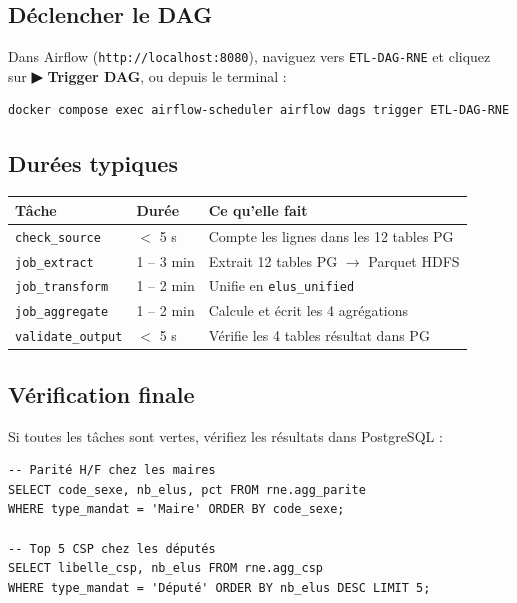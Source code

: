 \documentclass[11pt,a4paper]{article}
\begin{document}
\subsection*{Déclencher le DAG}

Dans Airflow (\texttt{http://localhost:8080}), naviguez vers \texttt{ETL-DAG-RNE} et cliquez sur \textbf{▶ Trigger DAG}, ou depuis le terminal :

\begin{lstlisting}[style=bash, numbers=none]
docker compose exec airflow-scheduler airflow dags trigger ETL-DAG-RNE
\end{lstlisting}

\subsection*{Durées typiques}

\begin{center}
\begin{tabular}{lll}
  \toprule
  \textbf{Tâche}               & \textbf{Durée} & \textbf{Ce qu'elle fait} \\
  \midrule
  \texttt{check\_source}    & $<$ 5 s      & Compte les lignes dans les 12 tables PG \\
  \texttt{job\_extract}     & 1 -- 3 min   & Extrait 12 tables PG $\to$ Parquet HDFS \\
  \texttt{job\_transform}   & 1 -- 2 min   & Unifie en \texttt{elus\_unified} \\
  \texttt{job\_aggregate}   & 1 -- 2 min   & Calcule et écrit les 4 agrégations \\
  \texttt{validate\_output} & $<$ 5 s      & Vérifie les 4 tables résultat dans PG \\
  \bottomrule
\end{tabular}
\end{center}

\subsection*{Vérification finale}

Si toutes les tâches sont vertes, vérifiez les résultats dans PostgreSQL :

\begin{lstlisting}[style=bash, numbers=none]
-- Parité H/F chez les maires
SELECT code_sexe, nb_elus, pct FROM rne.agg_parite
WHERE type_mandat = 'Maire' ORDER BY code_sexe;

-- Top 5 CSP chez les députés
SELECT libelle_csp, nb_elus FROM rne.agg_csp
WHERE type_mandat = 'Député' ORDER BY nb_elus DESC LIMIT 5;
\end{lstlisting}
\end{document}
